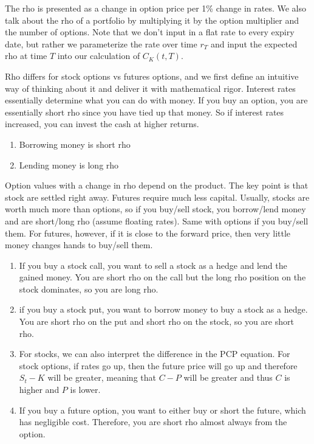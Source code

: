 \documentclass{article}
\begin{document}
    The rho is presented as a change in option price per 1\% change in rates. We also talk about the rho of a portfolio by multiplying it by the option multiplier and the number of options. Note that we don't input in a flat rate to every expiry date, but rather we parameterize the rate over time $r_T$ and input the expected rho at time $T$ into our calculation of $C_K (t, T)$.

    Rho differs for stock options vs futures options, and we first define an intuitive way of thinking about it and deliver it with mathematical rigor. Interest rates essentially determine what you can do with money. If you buy an option, you are essentially short rho since you have tied up that money. So if interest rates increased, you can invest the cash at higher returns.
    \begin{enumerate}
      \item Borrowing money is short rho
      \item Lending money is long rho
    \end{enumerate}

    Option values with a change in rho depend on the product. The key point is that stock are settled right away. Futures require much less capital. Usually, stocks are worth much more than options, so if you buy/sell stock, you borrow/lend money and are short/long rho (assume floating rates). Same with options if you buy/sell them. For futures, however, if it is close to the forward price, then very little money changes hands to buy/sell them.

    \begin{enumerate}
      \item If you buy a stock call, you want to sell a stock as a hedge and lend the gained money. You are short rho on the call but the long rho position on the stock dominates, so you are long rho.
      \item if you buy a stock put, you want to borrow money to buy a stock as a hedge. You are short rho on the put and short rho on the stock, so you are short rho.
      \item For stocks, we can also interpret the difference in the PCP equation. For stock options, if rates go up, then the future price will go up and therefore $S_t - K$ will be greater, meaning that $C - P$ will be greater and thus $C$ is higher and $P$ is lower.
      \item If you buy a future option, you want to either buy or short the future, which has negligible cost. Therefore, you are short rho almost always from the option.
    \end{enumerate}
\end{document}
